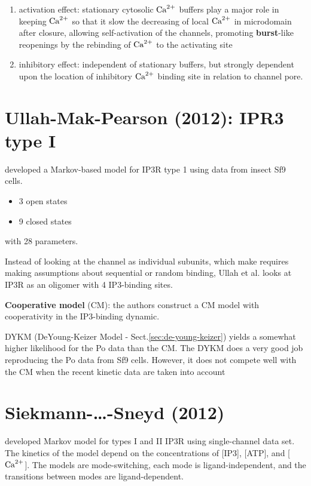 \begin{enumerate}
  
  \item activation effect: stationary cytosolic ${\text{Ca}^{2+}}$ buffers play a major role
  in keeping ${\text{Ca}^{2+}}$ so that it slow the decreasing of local ${\text{Ca}^{2+}}$ in microdomain
  after closure, allowing self-activation of the channels, promoting {\bf
  burst}-like reopenings by the rebinding of ${\text{Ca}^{2+}}$ to the activating site

  \item inhibitory effect: independent of stationary buffers, but strongly
  dependent upon the location of inhibitory ${\text{Ca}^{2+}}$ binding site in relation to
  channel pore. 
\end{enumerate}

\section{Ullah-Mak-Pearson (2012): IPR3 type I}
\label{sec:IP3R1-Ullah2012}
\label{sec:Ullah-Mak-Pearson-2012-IP3R}

\citep{ullah2012} developed a Markov-based model for IP3R type 1 using data
from insect Sf9 cells.
\begin{itemize}
  \item 3 open states
  \item 9 closed states
\end{itemize}
with 28 parameters.

Instead of looking at the channel as individual subunits, which make requires
making assumptions about sequential or random binding, Ullah et al.
looks at IP3R as an oligomer with 4 IP3-binding sites.

{\bf Cooperative model} (CM): the authors construct a CM model with
cooperativity in the IP3-binding dynamic.

DYKM (DeYoung-Keizer Model - Sect.\ref{sec:de-young-keizer}) yields a somewhat
higher likelihood for the Po data than the CM.
The DYKM does a very good job reproducing the Po data from Sf9 cells. However,
it does not compete well with the CM when the recent kinetic data are taken into
account




\section{Siekmann-\ldots-Sneyd (2012)}

\citep{siekmann2012} developed Markov model for types I and II IP3R using
single-channel data set. The kinetics of the model depend on the concentrations
of [IP3], [ATP], and [${\text{Ca}^{2+}}$]. The models are mode-switching, each mode is
ligand-independent, and the transitions between modes are ligand-dependent. 

